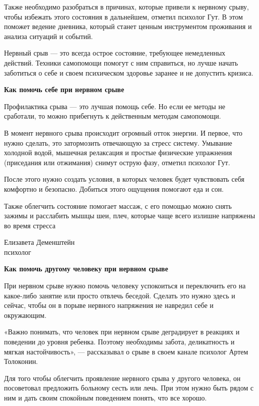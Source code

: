 Также необходимо разобраться в причинах, которые привели к нервному срыву, чтобы избежать этого состояния в дальнейшем, отметил психолог Гут. В этом поможет ведение дневника, который станет ценным инструментом проживания и анализа ситуаций и событий.

Нервный срыв — это всегда острое состояние, требующее немедленных действий. Техники самопомощи помогут с ним справиться, но лучше начать заботиться о себе и своем психическом здоровье заранее и не допустить кризиса.

\textbf{Как помочь себе при нервном срыве}

Профилактика срыва — это лучшая помощь себе. Но если ее методы не сработали, то можно прибегнуть к действенным методам самопомощи.

В момент нервного срыва происходит огромный отток энергии. И первое, что нужно сделать, это затормозить отвечающую за стресс систему. Умывание холодной водой, мышечная релаксация и простые физические упражнения (приседания или отжимания) снимут острую фазу, отметил психолог Гут.

После этого нужно создать условия, в которых человек будет чувствовать себя комфортно и безопасно. Добиться этого ощущения помогают еда и сон.

\begin{fancyquotes}
    Также облегчить состояние помогает массаж, с его помощью можно снять зажимы и расслабить мышцы шеи, плеч, которые чаще всего излишне напряжены во время стресса\\

    \begin{flushright}
        Елизавета Деменштейн\\психолог
    \end{flushright}
\end{fancyquotes}

\textbf{Как помочь другому человеку при нервном срыве}

При нервном срыве нужно помочь человеку успокоиться и переключить его на какое-либо занятие или просто отвлечь беседой. Сделать это нужно здесь и сейчас, чтобы он в порыве нервного напряжения не навредил себе и окружающим.

«Важно понимать, что человек при нервном срыве деградирует в реакциях и поведении до уровня ребенка. Поэтому необходимы забота, деликатность и мягкая настойчивость», — рассказывал о срыве в своем канале психолог Артем Толоконин.

Для того чтобы облегчить проявление нервного срыва у другого человека, он посоветовал предложить больному сесть или лечь. При этом нужно быть рядом с ним и дать своим спокойным поведением понять, что все хорошо.


